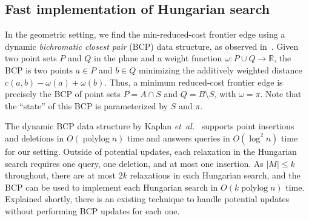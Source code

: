 \documentclass[a4paper,UKenglish]{socg-lipics-v2018}
\makeatletter
\def\etal{\emph{et~al.}}
\def\etal{\textit{et~al.}}
\def\polylog{\mathop{\mathrm{polylog}}}
\def\reals{\mathbb{R}}
\def\abs#1{\mathopen| #1 \mathclose|}		%
\theoremstyle{plain}
\numberwithin{figure}{section}
\def\EMPH#1{\textcolor{BrickRed}{{\emph{#1}}}}
\def\n@te#1{\textsf{\boldmath \textbf{$\langle\!\langle$#1$\rangle\!\rangle$}}\leavevmode}
\def\note#1{\textcolor{red}{\n@te{#1}}}
\makeatother
\begin{document}

\subsection{Fast implementation of Hungarian search}
\label{SS:fast-hungarian-matching}


In the geometric setting, we find the min-reduced-cost frontier edge using a dynamic
\EMPH{bichromatic closest pair} (BCP) data structure, as observed
in~\cite{AFPVX17,Vaidya89}.
Given two point sets $P$ and $Q$ in the plane and a weight function
$\omega: P\cup Q \to \reals$, the BCP is two points $a \in P$ and $b \in Q$
minimizing the additively weighted distance $c(a, b) - \omega(a) + \omega(b)$.
Thus, a minimum reduced-cost frontier edge is precisely the BCP of point sets
$P = A \cap S$ and $Q = B \setminus S$, with $\omega = \pi$.
Note that the ``state'' of this BCP is parameterized by $S$ and $\pi$.

The dynamic BCP data structure by Kaplan \etal~\cite{KMRSS17} supports point insertions and deletions in
$O(\polylog n)$ time and answers queries in $O(\log^2 n)$ time for our setting.
Outside of potential updates, each relaxation in the Hungarian search requires
one query, one deletion, and at most one insertion.
As $\abs{M} \leq k$ throughout, there are at most $2k$ relaxations in each
Hungarian search, and the BCP can be used to implement each Hungarian search
in $O(k\polylog n)$ time.
Explained shortly, there is an existing technique to handle potential updates
without performing BCP updates for each one.
\end{document}
